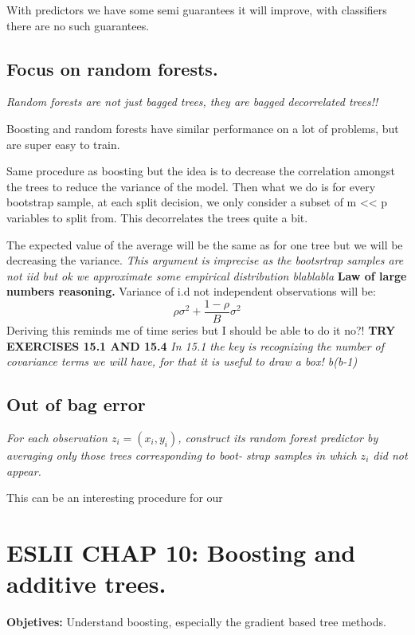 \documentclass{article}
\begin{document}
With predictors we have some semi guarantees it will improve, with classifiers there are no such guarantees.

\subsection{Focus on random forests.}
\textit{Random forests are not just bagged trees, they are bagged decorrelated trees!!}

Boosting and random forests have similar performance on a lot of problems, but are super easy to train.

Same procedure as boosting but the idea is to decrease the correlation amongst the trees to reduce the variance of the model.
Then what we do is for every bootstrap sample, at each split decision, we only consider a subset of m << p variables to split from. This decorrelates the trees quite a bit.

The expected value of the average will be the same as for one tree but we will be decreasing the variance. \textit{This argument is imprecise as the bootsrtrap samples are not iid but ok we approximate some empirical distribution blablabla} \textbf{Law of large numbers reasoning.}
Variance of i.d not independent observations will be:
$$\rho \sigma^2 + \frac{1-\rho}{B}\sigma^2$$
Deriving this reminds me of time series but I should be able to do it no?!
\textbf{TRY EXERCISES 15.1 AND 15.4}
\textit{In 15.1 the key is recognizing the number of covariance terms we will have, for that it is useful to draw a box! b(b-1)}

\subsection{Out of bag error}
\textit{For each observation $z_i = (x_i, y_i)$, construct its random forest
predictor by averaging only those trees corresponding to boot-
strap samples in which $z_i$ did not appear.}

This can be an interesting procedure for our 

\section{ESLII CHAP 10: Boosting and additive trees.}

\textbf{Objetives:} Understand boosting, especially the gradient based tree methods.
\end{document}

